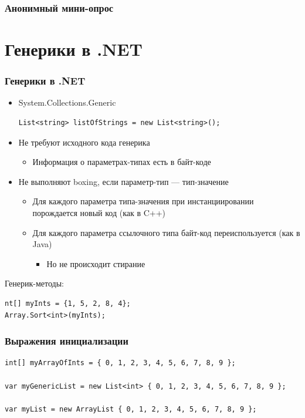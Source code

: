 \documentclass{../../slides-style}
\begin{document}
    \begin{frame}
        \frametitle{Анонимный мини-опрос}
    \end{frame}

    \section{Генерики в .NET}

    \begin{frame}[fragile]
        \frametitle{Генерики в .NET}
        \begin{itemize}
            \item System.Collections.Generic
            \begin{verbatim}
List<string> listOfStrings = new List<string>();
            \end{verbatim}
            \item Не требуют исходного кода генерика
            \begin{itemize}
                \item Информация о параметрах-типах есть в байт-коде
            \end{itemize}
            \item Не выполняют boxing, если параметр-тип --- тип-значение
            \begin{itemize}
                \item Для каждого параметра типа-значения при инстанциировании порождается новый код (как в C++)
                \item Для каждого параметра ссылочного типа байт-код переиспользуется (как в Java)
                \begin{itemize}
                    \item Но не происходит стирание
                \end{itemize}
            \end{itemize}
        \end{itemize}

        Генерик-методы:
        \begin{verbatim}
nt[] myInts = {1, 5, 2, 8, 4};
Array.Sort<int>(myInts);
        \end{verbatim}
    \end{frame}

    \begin{frame}[fragile]
        \frametitle{Выражения инициализации}
        \begin{verbatim}
int[] myArrayOfInts = { 0, 1, 2, 3, 4, 5, 6, 7, 8, 9 };

var myGenericList = new List<int> { 0, 1, 2, 3, 4, 5, 6, 7, 8, 9 };

var myList = new ArrayList { 0, 1, 2, 3, 4, 5, 6, 7, 8, 9 };
        \end{verbatim}
    \end{frame}
\end{document}
